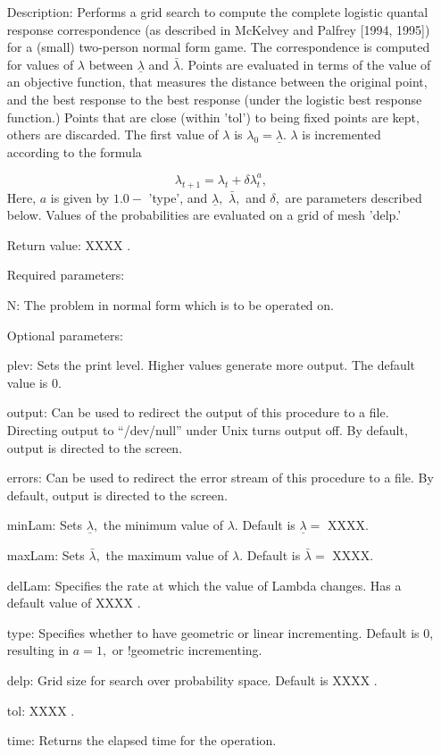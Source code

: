 \begin{itemize}
\bd
\item
[Description:] Performs a grid search to compute the complete logistic
quantal response correspondence (as described in McKelvey and Palfrey
[1994, 1995]) for a (small) two-person normal form game.  The
correspondence is computed for values of $\lambda$ between
$\underline{\lambda}$ and $\bar{\lambda}.$ Points are evaluated in
terms of the value of an objective function, that measures the
distance between the original point, and the best response to the best
response (under the logistic best response function.)  Points that are
close (within 'tol') to being fixed points are kept, others are
discarded.  The first value of $\lambda$ is $\lambda_0 =
\underline\lambda.$ $\lambda$ is incremented according to the formula

$$  
\lambda_{t+1} = \lambda_t +\delta \lambda_t^a,
$$ 
Here, $a$ is given by $1.0 - $ 'type', and $\underline\lambda,$
$\bar\lambda,$ and $\delta,$ are parameters described below.  Values
of the probabilities are evaluated on a grid of mesh 'delp.'

\item
[Return value:] XXXX .
\item
[Required parameters:]\hfil\null
	
\bd
\item  
[N:] The problem in normal form which is to be operated on.
\ed

\item
[Optional parameters:]\hfil\null

\bd
\item	
 [plev:] Sets the print level.  Higher values generate more output.
The default value is 0.
\item
[output:] Can be used to redirect the output of this procedure to a
file.  Directing output to ``/dev/null'' under Unix turns output off.
By default, output is directed to the screen.
\item
[errors:] Can be used to redirect the error stream of this procedure
to a file.  By default, output is directed to the screen.
\item
[minLam:] Sets $\underline\lambda,$ the minimum value of $\lambda.$
Default is $\underline\lambda = $ XXXX.
\item
[maxLam:]  Sets $\bar\lambda,$ the maximum value of $\lambda.$
Default is $\bar\lambda = $ XXXX.
\item
[delLam:] Specifies the rate at which the value of Lambda changes.
Has a default value of XXXX .
\item
[type:] Specifies whether to have geometric or linear incrementing.
Default is 0, resulting in $a = 1,$ or !geometric incrementing.
\item
[delp:] Grid size for search over probability space.  Default is XXXX .
\item
[tol:] XXXX .
\item
[time:] Returns the elapsed time for the operation.
\ed
\ed


\end{itemize}
